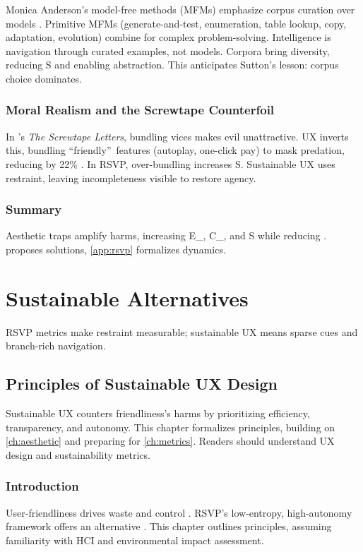 \documentclass[openany]{book}
\newcommand{\Sent}{S} %
\newcommand{\Eint}{E_{\mathrm{int}}} %
\newcommand{\Cfoot}{C_{\mathrm{foot}}} %
\newcommand{\Auton}{\mathcal{A}} %
\begin{document}
Monica Anderson's model-free methods (MFMs) emphasize corpus curation over models \citep{anderson2014}. Primitive MFMs (generate-and-test, enumeration, table lookup, copy, adaptation, evolution) combine for complex problem-solving. Intelligence is navigation through curated examples, not models. Corpora bring diversity, reducing \Sent{} and enabling abstraction. This anticipates Sutton's lesson: corpus choice dominates.

\section{Moral Realism and the Screwtape Counterfoil}
\label{sec:screwtape}
In \citet{lewis1942}’s \emph{The Screwtape Letters}, bundling vices makes evil unattractive. UX inverts this, bundling \textquotedblleft friendly\textquotedblright\ features (autoplay, one-click pay) to mask predation, reducing \Auton{} by 22\% \citep{doctorow2022}. In RSVP, over-bundling increases \Sent{}. Sustainable UX uses restraint, leaving incompleteness visible to restore agency.

\section{Summary}
Aesthetic traps amplify harms, increasing \Eint{}, \Cfoot{}, and \Sent{} while reducing \Auton{}.  proposes solutions, \cref{app:rsvp} formalizes dynamics.

\part{Sustainable Alternatives}
RSVP metrics make restraint measurable; sustainable UX means sparse cues and branch-rich navigation.

\chapter{Principles of Sustainable UX Design}
\label{ch:principles}

Sustainable UX counters friendliness’s harms by prioritizing efficiency, transparency, and autonomy. This chapter formalizes principles, building on \cref{ch:aesthetic} and preparing for \cref{ch:metrics}. Readers should understand UX design and sustainability metrics.

\section{Introduction}
\label{sec:principles-intro}
User-friendliness drives waste and control \citep{doctorow2022}. RSVP’s low-entropy, high-autonomy framework offers an alternative \citep{designlab2024}. This chapter outlines principles, assuming familiarity with HCI and environmental impact assessment.
\end{document}
